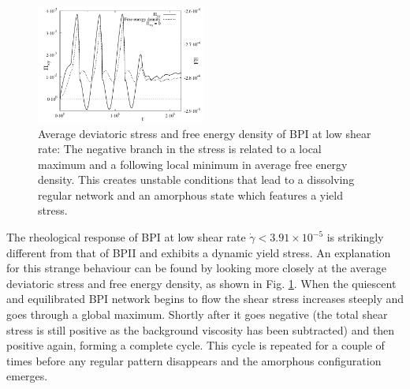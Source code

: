\documentclass[aps,pre,reprint,superscriptaddress, twocolumn]{revtex4}
\newcommand{\e}[1]{\times10^{#1}}
\newcommand{\gd}{\dot{\gamma}}
\begin{document}
\begin{figure}[htpb]
\includegraphics[width=0.495\textwidth]{stress_fe_yield_bp1.pdf}
\caption{Average deviatoric stress and free energy density of BPI at low shear rate: 
The negative branch in the stress is related to a local maximum and a following local 
minimum in average free energy density. This creates unstable conditions that lead 
to a dissolving regular network and an amorphous state which features a yield stress.}
\label{bp1-fe-yield}
\end{figure}

The rheological response of BPI at low shear rate $\gd<3.91\e{-5}$ 
is strikingly different from that of BPII and exhibits a
dynamic yield stress.
An explanation for this strange behaviour can be found by 
looking more closely at the average deviatoric stress and 
free energy density, as shown in Fig. \ref{bp1-fe-yield}.
When the quiescent and equilibrated BPI network begins to flow
the shear stress increases steeply and goes through a global maximum.
Shortly after it goes negative (the total shear stress is still
positive as the background viscosity has been subtracted) and then positive
again, forming a complete cycle. 
This cycle is repeated for a couple of times before 
any regular pattern disappears and the amorphous configuration 
emerges.
\end{document}
